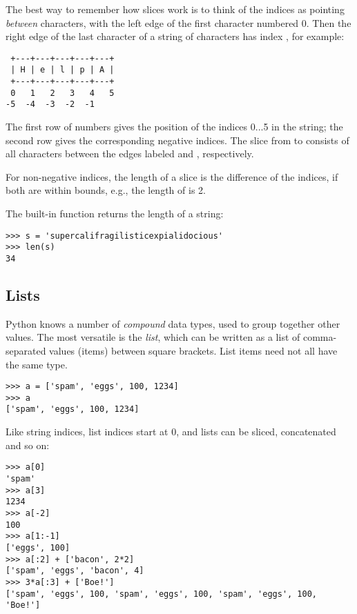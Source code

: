 \documentclass{manual}
\begin{document}
The best way to remember how slices work is to think of the indices as
pointing \emph{between} characters, with the left edge of the first
character numbered 0.  Then the right edge of the last character of a
string of  characters has index , for example:

\begin{verbatim}
 +---+---+---+---+---+ 
 | H | e | l | p | A |
 +---+---+---+---+---+ 
 0   1   2   3   4   5 
-5  -4  -3  -2  -1
\end{verbatim}

The first row of numbers gives the position of the indices 0...5 in
the string; the second row gives the corresponding negative indices.
The slice from  to  consists of all characters between
the edges labeled  and , respectively.

For non-negative indices, the length of a slice is the difference of
the indices, if both are within bounds, e.g., the length of
 is 2.

The built-in function  returns the length of a string:

\begin{verbatim}
>>> s = 'supercalifragilisticexpialidocious'
>>> len(s)
34
\end{verbatim}

\subsection{Lists \label{lists}}

Python knows a number of \emph{compound} data types, used to group
together other values.  The most versatile is the \emph{list}, which
can be written as a list of comma-separated values (items) between
square brackets.  List items need not all have the same type.

\begin{verbatim}
>>> a = ['spam', 'eggs', 100, 1234]
>>> a
['spam', 'eggs', 100, 1234]
\end{verbatim}

Like string indices, list indices start at 0, and lists can be sliced,
concatenated and so on:

\begin{verbatim}
>>> a[0]
'spam'
>>> a[3]
1234
>>> a[-2]
100
>>> a[1:-1]
['eggs', 100]
>>> a[:2] + ['bacon', 2*2]
['spam', 'eggs', 'bacon', 4]
>>> 3*a[:3] + ['Boe!']
['spam', 'eggs', 100, 'spam', 'eggs', 100, 'spam', 'eggs', 100, 'Boe!']
\end{verbatim}
\end{document}
